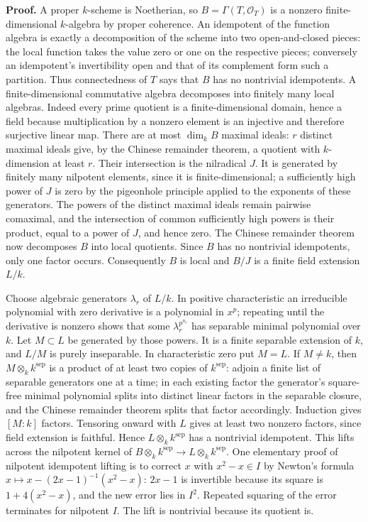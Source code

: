 \documentclass[11pt]{article}
\begin{document}
\textbf{Proof.} A proper \(k\)-scheme is Noetherian, so
\(B=\Gamma(T,\mathcal O_T)\) is a nonzero finite-dimensional
\(k\)-algebra by proper coherence. An idempotent of the function algebra
is exactly a decomposition of the scheme into two open-and-closed
pieces: the local function takes the value zero or one on the respective
pieces; conversely an idempotent's invertibility open and that of its
complement form such a partition. Thus connectedness of \(T\) says that
\(B\) has no nontrivial idempotents. A finite-dimensional commutative
algebra decomposes into finitely many local algebras. Indeed every prime
quotient is a finite-dimensional domain, hence a field because
multiplication by a nonzero element is an injective and therefore
surjective linear map. There are at most \(\dim_k B\) maximal ideals:
\(r\) distinct maximal ideals give, by the Chinese remainder theorem, a
quotient with \(k\)-dimension at least \(r\). Their intersection is the
nilradical \(J\). It is generated by finitely many nilpotent elements,
since it is finite-dimensional; a sufficiently high power of \(J\) is
zero by the pigeonhole principle applied to the exponents of these
generators. The powers of the distinct maximal ideals remain pairwise
comaximal, and the intersection of common sufficiently high powers is
their product, equal to a power of \(J\), and hence zero. The Chinese
remainder theorem now decomposes \(B\) into local quotients. Since \(B\)
has no nontrivial idempotents, only one factor occurs. Consequently
\(B\) is local and \(B/J\) is a finite field extension \(L/k\).

Choose algebraic generators \(\lambda_r\) of \(L/k\). In positive
characteristic an irreducible polynomial with zero derivative is a
polynomial in \(x^p\); repeating until the derivative is nonzero shows
that some \(\lambda_r^{p^{n_r}}\) has separable minimal polynomial over
\(k\). Let \(M\subset L\) be generated by those powers. It is a finite
separable extension of \(k\), and \(L/M\) is purely inseparable. In
characteristic zero put \(M=L\). If \(M\ne k\), then
\(M\otimes_k k^{\mathrm{sep}}\) is a product of at least two copies of
\(k^{\mathrm{sep}}\): adjoin a finite list of separable generators one
at a time; in each existing factor the generator's square-free minimal
polynomial splits into distinct linear factors in the separable closure,
and the Chinese remainder theorem splits that factor accordingly.
Induction gives \([M:k]\) factors. Tensoring onward with \(L\) gives at
least two nonzero factors, since field extension is faithful. Hence
\(L\otimes_k k^{\mathrm{sep}}\) has a nontrivial idempotent. This lifts
across the nilpotent kernel of
\(B\otimes_k k^{\mathrm{sep}}\to L\otimes_k k^{\mathrm{sep}}\). One
elementary proof of nilpotent idempotent lifting is to correct \(x\)
with \(x^2-x\in I\) by Newton's formula
\(x\mapsto x-(2x-1)^{-1}(x^2-x)\): \(2x-1\) is invertible because its
square is \(1+4(x^2-x)\), and the new error lies in \(I^2\). Repeated
squaring of the error terminates for nilpotent \(I\). The lift is
nontrivial because its quotient is.
\end{document}
